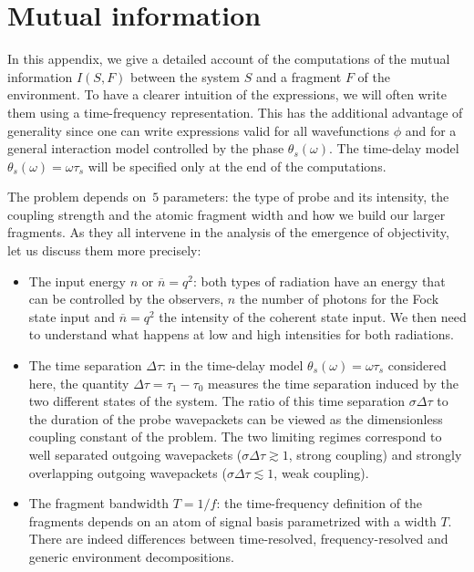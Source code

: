 \section{Mutual information}
\label{sec/details}

In this appendix, we give a detailed account of the computations of the
mutual information $I(S,F)$ between the system $S$ and a fragment $F$ of
the environment. To have a clearer intuition of the expressions,
we will often write them using a time-frequency
representation. This has the additional advantage of generality since one can write
expressions valid for all wavefunctions $\phi$ and for a general interaction
model controlled by the phase  $\theta_s(\omega)$. The
time-delay model $\theta_s(\omega) = \omega \tau_s$ will be specified
only at the end of the
computations. 

The problem depends on~$5$ parameters:
the type of probe and its intensity, the coupling strength 
and the atomic fragment width and how we build our larger fragments. 
As they all intervene in the analysis of the emergence of objectivity,
let us discuss them more precisely:
%
\begin{itemize}
\item The input energy $n$ or $\overline{n}=q^2$: both types of radiation have an energy that
can be controlled by the observers, $n$ the number of photons for the Fock
state input and $\overline{n}=q^2$ the intensity of the coherent state input.
We then need to understand what happens at low and high intensities for both
radiations.

\item The time separation $\Delta\tau$: in the 
time-delay model $\theta_s(\omega) = \omega \tau_s$ considered here,
the quantity $\Delta\tau = \tau_1-\tau_0$ measures the
time separation induced by the two different states of the system.
The ratio of this time separation 
$\sigma \Delta\tau$ to the duration of the
probe wavepackets can be viewed as the dimensionless coupling
constant of the problem. The two limiting regimes correspond to well
separated outgoing wavepackets ($\sigma \Delta\tau\gtrsim 1$,
strong coupling)
and strongly overlapping outgoing wavepackets ($\sigma
\Delta\tau\lesssim 1$, weak coupling).

\item The fragment bandwidth $T=1/f$: the time-frequency definition of the
fragments depends on an atom of signal basis parametrized with a width $T$.
There are indeed differences between time-resolved, frequency-resolved and
generic environment decompositions.
\end{itemize}

